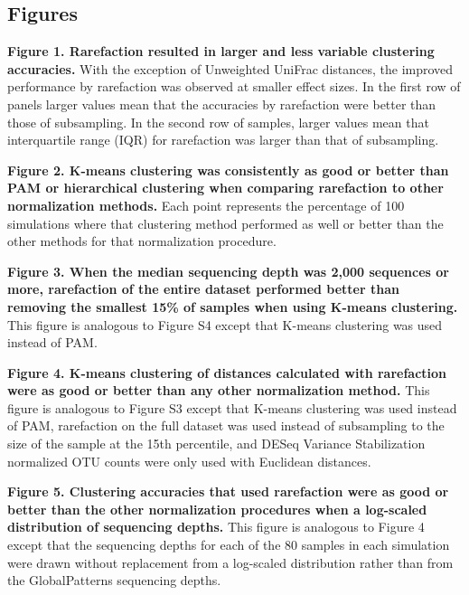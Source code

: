 \documentclass[
]{article}
\begin{document}

\setlength{\parindent}{0in}
\setlength{\leftskip}{0in}

\newpage

\hypertarget{figures}{%
\subsection{Figures}\label{figures}}

\textbf{Figure 1. Rarefaction resulted in larger and less variable
clustering accuracies.} With the exception of Unweighted UniFrac
distances, the improved performance by rarefaction was observed at
smaller effect sizes. In the first row of panels larger values mean that
the accuracies by rarefaction were better than those of subsampling. In
the second row of samples, larger values mean that interquartile range
(IQR) for rarefaction was larger than that of subsampling.

\textbf{Figure 2. K-means clustering was consistently as good or better
than PAM or hierarchical clustering when comparing rarefaction to other
normalization methods.} Each point represents the percentage of 100
simulations where that clustering method performed as well or better
than the other methods for that normalization procedure.

\textbf{Figure 3. When the median sequencing depth was 2,000 sequences
or more, rarefaction of the entire dataset performed better than
removing the smallest 15\% of samples when using K-means clustering.}
This figure is analogous to Figure S4 except that K-means clustering was
used instead of PAM.

\textbf{Figure 4. K-means clustering of distances calculated with
rarefaction were as good or better than any other normalization method.}
This figure is analogous to Figure S3 except that K-means clustering was
used instead of PAM, rarefaction on the full dataset was used instead of
subsampling to the size of the sample at the 15th percentile, and DESeq
Variance Stabilization normalized OTU counts were only used with
Euclidean distances.

\textbf{Figure 5. Clustering accuracies that used rarefaction were as
good or better than the other normalization procedures when a log-scaled
distribution of sequencing depths.} This figure is analogous to Figure 4
except that the sequencing depths for each of the 80 samples in each
simulation were drawn without replacement from a log-scaled distribution
rather than from the GlobalPatterns sequencing depths.
\end{document}

